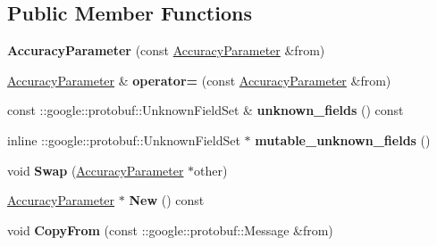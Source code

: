 \subsection*{Public Member Functions}
\begin{DoxyCompactItemize}
\item 
\mbox{\label{classcaffe_1_1_accuracy_parameter_a48beee3ea0844f7b3de5691fdd5bcba5}} 
{\bfseries Accuracy\+Parameter} (const \mbox{\hyperlink{classcaffe_1_1_accuracy_parameter}{Accuracy\+Parameter}} \&from)
\item 
\mbox{\label{classcaffe_1_1_accuracy_parameter_abf1de9917962ffdec97ffdfa728ad31e}} 
\mbox{\hyperlink{classcaffe_1_1_accuracy_parameter}{Accuracy\+Parameter}} \& {\bfseries operator=} (const \mbox{\hyperlink{classcaffe_1_1_accuracy_parameter}{Accuracy\+Parameter}} \&from)
\item 
\mbox{\label{classcaffe_1_1_accuracy_parameter_a7d56021534e1a95134749e993e854776}} 
const \+::google\+::protobuf\+::\+Unknown\+Field\+Set \& {\bfseries unknown\+\_\+fields} () const
\item 
\mbox{\label{classcaffe_1_1_accuracy_parameter_a21fb04e8e6029a2ea0563c53b7b22467}} 
inline \+::google\+::protobuf\+::\+Unknown\+Field\+Set $\ast$ {\bfseries mutable\+\_\+unknown\+\_\+fields} ()
\item 
\mbox{\label{classcaffe_1_1_accuracy_parameter_a7f28ff8d7ad5eeaa5dd3473f6a38b4be}} 
void {\bfseries Swap} (\mbox{\hyperlink{classcaffe_1_1_accuracy_parameter}{Accuracy\+Parameter}} $\ast$other)
\item 
\mbox{\label{classcaffe_1_1_accuracy_parameter_aceead5833a0dca16b8734b0800316a20}} 
\mbox{\hyperlink{classcaffe_1_1_accuracy_parameter}{Accuracy\+Parameter}} $\ast$ {\bfseries New} () const
\item 
\mbox{\label{classcaffe_1_1_accuracy_parameter_a408ec5c7e2f3983e57a766f361381e2e}} 
void {\bfseries Copy\+From} (const \+::google\+::protobuf\+::\+Message \&from)
\item 

\end{DoxyCompactItemize}
